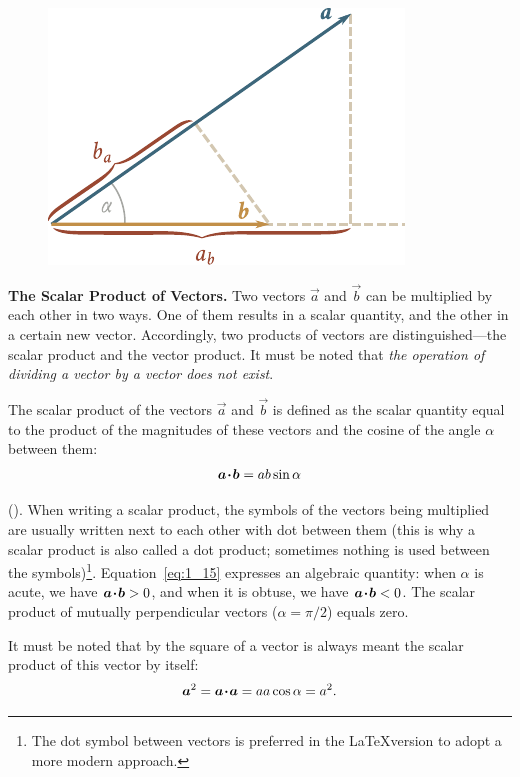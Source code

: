 \begin{figure}[t]
	\begin{center}
		\includegraphics[scale=0.9]{figures/ch_01/fig_1_15.pdf}
		\caption[]{}
		\label{fig:1_15}
	\end{center}
	\vspace{-1.0cm}
\end{figure}

\textbf{The Scalar Product of Vectors.} Two vectors $\vec{a}$ and $\vec{b}$ can be multiplied by each other in two ways. One of them results in a scalar quantity, and the other in a certain new vector. Accordingly, two products of vectors are distinguished---the scalar product and the vector product. It must be noted that \textit{the operation of dividing a vector by a vector does not exist}.

The scalar product of the vectors $\vec{a}$ and $\vec{b}$ is defined as the scalar quantity equal to the product of the magnitudes of these vectors and the cosine of the angle $\alpha$ between them:
\begin{equation}\label{eq:1_15}
\boldsymbol{a\!\cdot\!b} = ab\sin\alpha
\end{equation}

\noindent
(). When writing a scalar product, the symbols of the vectors being multiplied are usually written next to each other with dot between them (this is why a scalar product is also called a dot product; sometimes nothing is used between the symbols)\footnote{The dot symbol between vectors is preferred in the \LaTeX version to adopt a more modern approach.}. Equation~\eqref{eq:1_15} expresses an algebraic quantity: when $\alpha$ is acute, we have $\boldsymbol{a\!\cdot\!b}>0$, and when it is obtuse, we have $\boldsymbol{a\!\cdot\!b}<0$. The scalar product of mutually perpendicular vectors ($\alpha=\pi/2$) equals zero.

It must be noted that by the square of a vector is always meant the scalar product of this vector by itself:
\begin{equation}\label{eq:1_16}
\boldsymbol{a}^2 = \boldsymbol{a\!\cdot\!a} = aa\cos\alpha = a^2.
\end{equation}

